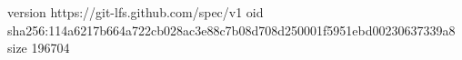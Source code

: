 version https://git-lfs.github.com/spec/v1
oid sha256:114a6217b664a722cb028ac3e88c7b08d708d250001f5951ebd00230637339a8
size 196704
